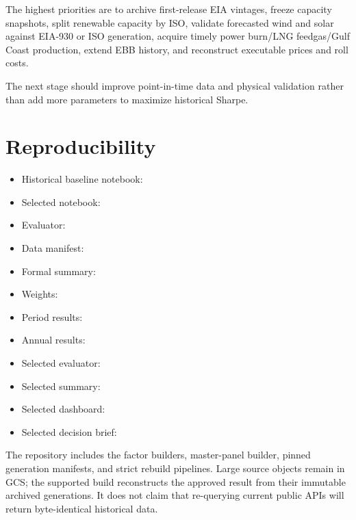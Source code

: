 \documentclass[11pt,a4paper]{article}
\begin{document}
The highest priorities are to archive first-release EIA vintages, freeze
capacity snapshots, split renewable capacity by ISO, validate forecasted wind
and solar against EIA-930 or ISO generation, acquire timely power burn/LNG
feedgas/Gulf Coast production, extend EBB history, and reconstruct executable
prices and roll costs.

The next stage should improve point-in-time data and physical validation rather
than add more parameters to maximize historical Sharpe.

\section{Reproducibility}

\begin{itemize}
  \item Historical baseline notebook:
  \item Selected notebook:
  \item Evaluator: 
  \item Data manifest: 
  \item Formal summary: 
  \item Weights: 
  \item Period results: 
  \item Annual results: 
  \item Selected evaluator:
  \item Selected summary:
  \item Selected dashboard:
  \item Selected decision brief:
\end{itemize}

The repository includes the factor builders, master-panel builder, pinned
generation manifests, and strict rebuild pipelines. Large source objects
remain in GCS; the supported build reconstructs the approved result from their
immutable archived generations. It does not claim that re-querying current
public APIs will return byte-identical historical data.
\end{document}
